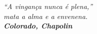 \chapter*{}


\vfill
\hfill
\begin{minipage}{.6\textwidth}
\begin{center}
\emph{``A vingança nunca é plena,''\\[3mm]
        mata a alma e a envenena.\\[3mm]
\bfseries  Colorado, Chapolin}
\end{center}
\end{minipage}


%
%
%
%
%
%
%
